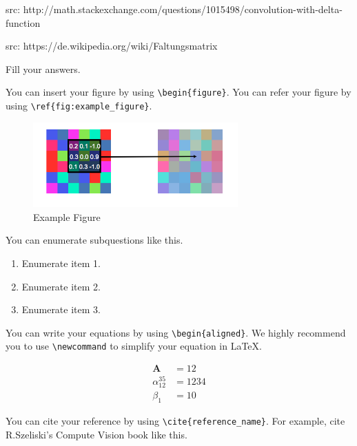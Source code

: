 \documentclass[12pt,a4paper]{article}
\newcommand{\Ab}{\bm{A}}
\begin{document}
src: http://math.stackexchange.com/questions/1015498/convolution-with-delta-function




src: https://de.wikipedia.org/wiki/Faltungsmatrix



Fill your answers.

You can insert your figure by using \verb|\begin{figure}|.
You can refer your figure by using \verb|\ref{fig:example_figure}|.

\begin{figure}[!h]
    \begin{center}
        \includegraphics[width=0.7\textwidth]{assets/fig1.png}
        \caption{Example Figure}
        \label{fig:example_figure}
    \end{center}
\end{figure}

You can enumerate subquestions like this.

\begin{enumerate}
    \item Enumerate item 1.
    \item Enumerate item 2.
    \item Enumerate item 3.
\end{enumerate}

You can write your equations by using \verb|\begin{aligned}|.
We highly recommend you to use \verb|\newcommand| to simplify your equation in \LaTeX.

\begin{align}
    \Ab &= 12 \\
    \alpha_{12}^{35} &= 1234 \\
    \beta_1 &= 10
\end{align}

You can cite your reference by using \verb|\cite{reference_name}|.
For example, cite R.Szeliski's Compute Vision book \cite{szeliski2010computer} like this.


\end{document}
